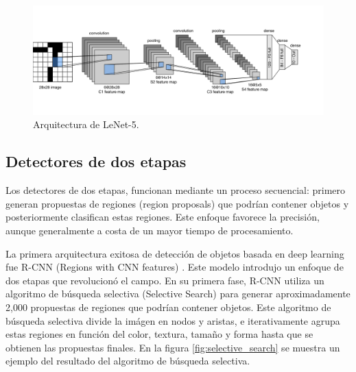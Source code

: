 \documentclass[11pt,spanish,listoffigures,listoftables]{tfgetsinf}
\begin{document}
\begin{figure}[H]
   \centering
   \includegraphics[width=1\textwidth]{images/estado_del_arte/lenet-5.png}
   \caption{Arquitectura de LeNet-5.}
   \label{fig:cnn}
\end{figure}

\subsection{Detectores de dos etapas}
Los detectores de dos etapas, funcionan mediante un proceso secuencial: primero generan propuestas de regiones (region proposals) que podrían contener objetos y posteriormente clasifican estas regiones. Este enfoque favorece la precisión, aunque generalmente a costa de un mayor tiempo de procesamiento.

La primera arquitectura exitosa de detección de objetos basada en deep learning fue R-CNN (Regions with CNN features) \cite{girshick2014richfeaturehierarchiesaccurate}. Este modelo introdujo un enfoque de dos etapas que revolucionó el campo. En su primera fase, R-CNN utiliza un algoritmo de búsqueda selectiva (Selective Search) para generar aproximadamente 2,000 propuestas de regiones que podrían contener objetos. Este algoritmo de búsqueda selectiva divide la imágen en nodos y aristas, e iterativamente agrupa estas regiones en función del color, textura, tamaño y forma hasta que se obtienen las propuestas finales. En la figura \ref{fig:selective_search}\cite{explainningAI} se muestra un ejemplo del resultado del algoritmo de búsqueda selectiva.
\end{document}
